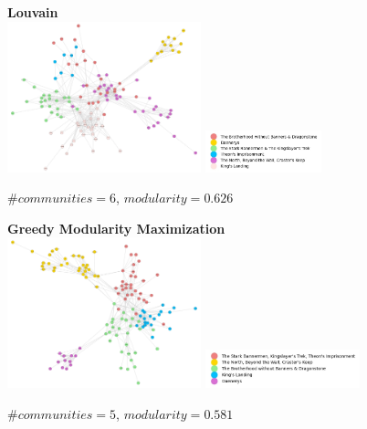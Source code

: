 \documentclass[10pt,twocolumn,letterpaper]{article}
\begin{document}
\begin{figure}[!h]
    \centering
    \textbf{Louvain} \\
    \includegraphics[width=0.5\textwidth]{img/s3/communities_louvain.jpg}
    \includegraphics[width=0.3\textwidth]{img/s3/louvain_legend.jpg}\\
    \caption{\small{$\#communities=6$, $modularity=0.626$}}
    \label{fig:louvain_s3}
    \vspace{1cm}
\end{figure}



\begin{figure}[!h]
    \centering
    \textbf{Greedy Modularity Maximization}\\
    \includegraphics[width=0.5\textwidth]{img/s3/communities_gmm.jpg}
    \includegraphics[width=0.4\textwidth]{img/s3/gmm_legend.jpg}\\
    \caption{\small{$\#communities=5$, $modularity=0.581$}}
    \label{fig:gmm_s3}
\end{figure}
\end{document}
